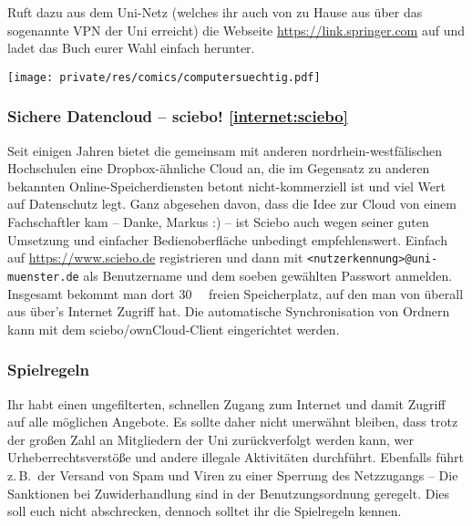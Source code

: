 \begin{multicols}{2}
Ruft dazu aus dem Uni-Netz (welches ihr auch von zu Hause aus über das sogenannte VPN der Uni erreicht) die Webseite \url{https://link.springer.com} auf und ladet das Buch eurer Wahl einfach herunter.

\begin{center}
	\texttt{[image: private/res/comics/computersuechtig.pdf]}
\end{center}

\subsubsection[Sichere Datencloud -- sciebo!]{Sichere Datencloud -- sciebo! \cref{internet:sciebo}}
Seit einigen Jahren bietet die \UniMuenster{} gemeinsam mit anderen nordrhein-westfälischen Hochschulen eine Dropbox-ähnliche Cloud an, die im Gegensatz zu anderen bekannten Online-Speicherdiensten betont nicht-kommerziell ist und viel Wert auf Datenschutz legt.
Ganz abgesehen davon, dass die Idee zur Cloud von einem Fachschaftler kam -- Danke, Markus :) -- ist Sciebo auch wegen seiner guten Umsetzung und einfacher Bedienoberfläche unbedingt empfehlenswert.
Einfach auf \url{https://www.sciebo.de} registrieren und dann mit \texttt{<nutzerkennung>@uni-muenster.de} als Benutzername und dem soeben gewählten Passwort anmelden.
Insgesamt bekommt man dort \SI{30}{\giga\byte} freien Speicherplatz, auf den man von überall aus über's Internet Zugriff hat.
Die automatische Synchronisation von Ordnern kann mit dem sciebo/ownCloud-Client eingerichtet werden.

\subsubsection{Spielregeln}
Ihr habt einen ungefilterten, schnellen Zugang zum Internet und damit Zugriff auf alle möglichen Angebote.
Es sollte daher nicht unerwähnt bleiben, dass trotz der großen Zahl an Mitgliedern der Uni zurückverfolgt werden kann, wer Urheberrechtsverstöße und andere illegale Aktivitäten durchführt.
Ebenfalls führt z.\,B.\ der Versand von Spam und Viren zu einer Sperrung des Netzzugangs -- Die Sanktionen bei Zuwiderhandlung sind in der Benutzungsordnung geregelt.
Dies soll euch nicht abschrecken, dennoch solltet ihr die Spielregeln kennen.


\end{multicols}
